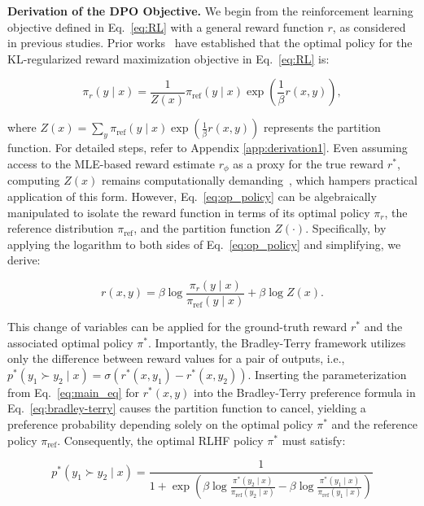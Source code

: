 \textbf{Derivation of the DPO Objective.} We begin from the reinforcement learning objective defined in Eq.~\ref{eq:RL} with a general reward function $r$, as considered in previous studies. Prior works~\citep{peters2007reinforcement, peng2019advantage, korbak2022reinforcement, go2023aligning} have established that the optimal policy for the KL-regularized reward maximization objective in Eq.~\ref{eq:RL} is:

\begin{equation}\label{eq:op_policy}
    \pi_r(y\mid x) = \frac{1}{Z(x)}\pi_\text{ref}(y\mid x)\exp\left(\frac{1}{\beta}r(x, y)\right),
\end{equation}

where $Z(x) =\sum_{y}\pi_\text{ref}(y\mid x)\exp\left(\frac{1}{\beta}r(x, y)\right)$ represents the partition function. For detailed steps, refer to Appendix \ref{app:derivation1}. Even assuming access to the MLE-based reward estimate $r_{\phi}$ as a proxy for the true reward $r^*$, computing $Z(x)$ remains computationally demanding~\citep{korbak2022reinforcement, go2023aligning}, which hampers practical application of this form. However, Eq.~\ref{eq:op_policy} can be algebraically manipulated to isolate the reward function in terms of its optimal policy $\pi_r$, the reference distribution $\pi_\text{ref}$, and the partition function $Z(\cdot)$. Specifically, by applying the logarithm to both sides of Eq.~\ref{eq:op_policy} and simplifying, we derive:

\begin{equation}\label{eq:main_eq}
    r(x,y) =\beta \log \frac{\pi_r(y\mid x)}{\pi_\text{ref}(y\mid x)} + \beta \log Z(x).
\end{equation}

This change of variables can be applied for the ground-truth reward $r^*$ and the associated optimal policy $\pi^*$. Importantly, the Bradley-Terry framework utilizes only the difference between reward values for a pair of outputs, i.e., ${p^*(y_1 \succ y_2 \mid x) = \sigma(r^*(x, y_1) - r^*(x, y_2))}$. Inserting the parameterization from Eq.~\ref{eq:main_eq} for $r^*(x, y)$ into the Bradley-Terry preference formula in Eq.~\ref{eq:bradley-terry} causes the partition function to cancel, yielding a preference probability depending solely on the optimal policy $\pi^*$ and the reference policy $\pi_\text{ref}$. Consequently, the optimal RLHF policy $\pi^*$ must satisfy:

\begin{equation}\label{eq:objective}
    p^*(y_1\succ y_2 \mid x)=\frac{1}{1 + \exp\left(\beta \log \frac{\pi^*(y_2\mid x)}{\pi_\text{ref}(y_2\mid x)} - \beta \log \frac{\pi^*(y_1\mid x)}{\pi_\text{ref}(y_1\mid x)}\right)}
\end{equation}

